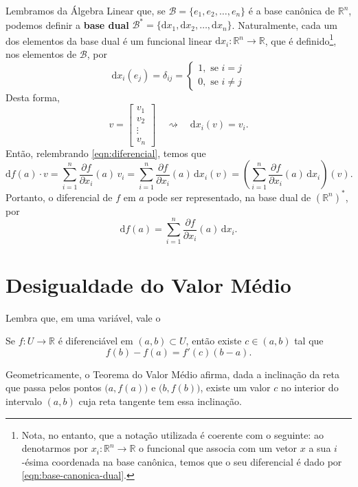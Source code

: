 Lembramos da Álgebra Linear que, se $\mathcal{B} = \{e_1, e_2, \dots, e_n\}$ é a base canônica de $\mathbb{R}^n$, podemos definir a \textbf{base dual} $\mathcal{B}^* = \{\mathrm{d}  x_1, \mathrm{d}  x_2, \dots, \mathrm{d}  x_n\}$. Naturalmente, cada um dos elementos da base dual é um funcional linear $\mathrm{d}  x_i: \mathbb{R}^n \to \mathbb{R}$, que é definido\footnote{Nota, no entanto, que a notação utilizada é coerente com o seguinte: ao denotarmos por $x_i : \mathbb{R}^n \to \mathbb{R}$ o funcional que associa com um vetor $x$ a sua $i$-ésima coordenada na base canônica, temos que o seu diferencial é dado por \eqref{eqn:base-canonica-dual}.}, nos elementos de $\mathcal{B}$, por
\[
\mathrm{d}  x_i (e_j) = \delta_{ij} = \begin{cases}
1, \mbox{ se } i = j \\
0, \mbox{ se } i \neq j 
\end{cases}
\] Desta forma,
\begin{equation}\label{eqn:base-canonica-dual}
v = \begin{bmatrix}
v_1 \\ v_2 \\ \vdots \\ v_n
\end{bmatrix} \quad \rightsquigarrow \quad \mathrm{d}  x_i (v) = v_i.
\end{equation} Então, relembrando \eqref{eqn:diferencial}, temos que
\[
\mathrm{d}  f(a) \cdot v = \sum_{i=1}^{n}  \frac{\partial f}{\partial x_i}(a) \, v_i = \sum_{i=1}^{n}  \frac{\partial f}{\partial x_i}(a) \, \mathrm{d}  x_i (v) = \left( \sum_{i=1}^{n}  \frac{\partial f}{\partial x_i}(a) \, \mathrm{d}  x_i \right) (v).
\] Portanto, o diferencial de $f$ em $a$ pode ser representado, na base dual de $(\mathbb{R}^n)^*$, por
\[
\mathrm{d}  f(a) = \sum_{i=1}^{n}  \frac{\partial f}{\partial x_i}(a) \, \mathrm{d}  x_i.
\]



\section{Desigualdade do Valor Médio}

Lembra que, em uma variável, vale o

\begin{teo}\label{thm:tvm}
	Se $f: U \to \mathbb{R}$ é diferenciável em $(a,b) \subset U$, então existe $c \in (a,b)$ tal que
	\[
	f(b) - f(a) = f'(c) (b-a).
	\]
\end{teo} Geometricamente, o Teorema do Valor Médio afirma, dada a inclinação da reta que passa pelos pontos $\big( a,f(a) \big)$ e $\big( b,f(b) \big)$, existe um valor $c$ no interior do intervalo $(a,b)$ cuja reta tangente tem essa inclinação.

